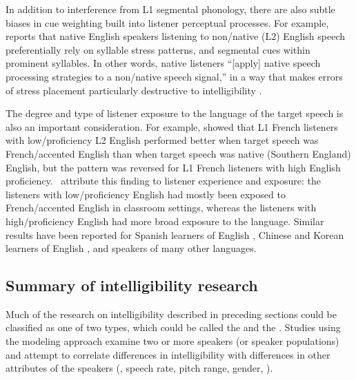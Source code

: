 In addition to interference from L1 segmental phonology, there are also subtle biases in cue weighting built into listener perceptual processes.  For example, \citeauthor*{Zielinski2008} reports that native English speakers listening to non\-/native (L2) English speech preferentially rely on syllable stress patterns, and segmental cues within prominent syllables.  In other words, native listeners “[apply] native speech processing strategies to a non\-/native speech signal,” in a way that makes errors of stress placement particularly destructive to intelligibility \citep[80]{Zielinski2008}.

The degree and type of listener exposure to the language of the target speech is also an important consideration.  For example, \citet{PinetEtAl2011} showed that L1 French listeners with low\-/proficiency L2 English performed better when target speech was French\-/accented English than when target speech was native (Southern England) English, but the pattern was reversed for L1 French listeners with high English proficiency.  \citeauthor*{PinetEtAl2011}\ attribute this finding to listener experience and exposure: the listeners with low\-/proficiency English had mostly been exposed to French\-/accented English in classroom settings, whereas the listeners with high\-/proficiency English had more broad exposure to the language.  Similar results have been reported for Spanish learners of English \citep{ImaiEtAl2005}, Chinese and Korean learners of English \citep{BentBradlow2003}, and speakers of many other languages.%


\subsection{Summary of intelligibility research\label{sec:IntelSummary}}
Much of the research on intelligibility described in preceding sections could be classified as one of two types, which could be called the  and the .  Studies using the modeling approach examine two or more speakers (or speaker populations) and attempt to correlate differences in intelligibility with differences in other attributes of the speakers (\eg, speech rate, pitch range, gender, \etc).\footnotemark{}  

